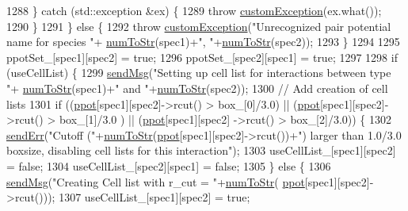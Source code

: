 \begin{DoxyCode}
1288         \} \textcolor{keywordflow}{catch} (std::exception &ex) \{
1289             \textcolor{keywordflow}{throw} \hyperlink{classcustom_exception}{customException}(ex.what());
1290         \}
1291     \} \textcolor{keywordflow}{else} \{
1292         \textcolor{keywordflow}{throw} \hyperlink{classcustom_exception}{customException}(\textcolor{stringliteral}{"Unrecognized pair potential name for species "}+
      \hyperlink{utilities_8h_ae6ed8fadf719af789711a7c0e99f44bc}{numToStr}(spec1)+\textcolor{stringliteral}{", "}+\hyperlink{utilities_8h_ae6ed8fadf719af789711a7c0e99f44bc}{numToStr}(spec2));
1293     \}
1294 
1295     ppotSet\_[spec1][spec2] = \textcolor{keyword}{true};
1296     ppotSet\_[spec2][spec1] = \textcolor{keyword}{true};
1297 
1298     \textcolor{keywordflow}{if} (useCellList) \{
1299         \hyperlink{utilities_8cpp_a08974c73a5b36c28b8ad1ef47fca77b0}{sendMsg}(\textcolor{stringliteral}{"Setting up cell list for interactions between type "}+
      \hyperlink{utilities_8h_ae6ed8fadf719af789711a7c0e99f44bc}{numToStr}(spec1)+\textcolor{stringliteral}{" and "}+\hyperlink{utilities_8h_ae6ed8fadf719af789711a7c0e99f44bc}{numToStr}(spec2));
1300         \textcolor{comment}{// Add creation of cell lists}
1301         \textcolor{keywordflow}{if} ((\hyperlink{classsim_system_ad2e290b5963f132e6a3a56cee35c8e9f}{ppot}[spec1][spec2]->rcut() > box\_[0]/3.0) || (\hyperlink{classsim_system_ad2e290b5963f132e6a3a56cee35c8e9f}{ppot}[spec1][spec2]->rcut() > box\_[1]/3.0
      ) || (\hyperlink{classsim_system_ad2e290b5963f132e6a3a56cee35c8e9f}{ppot}[spec1][spec2] ->rcut() > box\_[2]/3.0)) \{
1302             \hyperlink{utilities_8cpp_a6dacf3c3c19aa1e13a4d5a148fe5114e}{sendErr}(\textcolor{stringliteral}{"Cutoff ("}+\hyperlink{utilities_8h_ae6ed8fadf719af789711a7c0e99f44bc}{numToStr}(\hyperlink{classsim_system_ad2e290b5963f132e6a3a56cee35c8e9f}{ppot}[spec1][spec2]->rcut())+\textcolor{stringliteral}{") larger than
       1.0/3.0 boxsize, disabling cell lists for this interaction"});
1303             useCellList\_[spec1][spec2] = \textcolor{keyword}{false};
1304             useCellList\_[spec2][spec1] = \textcolor{keyword}{false};
1305         \} \textcolor{keywordflow}{else} \{
1306             \hyperlink{utilities_8cpp_a08974c73a5b36c28b8ad1ef47fca77b0}{sendMsg}(\textcolor{stringliteral}{"Creating Cell list with r\_cut = "}+\hyperlink{utilities_8h_ae6ed8fadf719af789711a7c0e99f44bc}{numToStr}(
      \hyperlink{classsim_system_ad2e290b5963f132e6a3a56cee35c8e9f}{ppot}[spec1][spec2]->rcut()));
1307             useCellList\_[spec1][spec2] = \textcolor{keyword}{true};

\end{DoxyCode}
